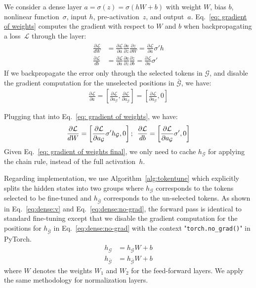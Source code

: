 We consider a dense layer $a = \sigma (z) = \sigma (hW + b)$ with weight $W$, bias $b$, nonlinear function~$\sigma$, input $h$, pre-activation~$z$, and output~$a$.
Eq.~\ref{eq: gradient of weights} computes the gradient with respect to $W$ and $b$ when backpropagating a loss~$\mathcal{L}$ through the layer:
\begin{align}\label{eq: gradient of weights}
\begin{split}
 \frac{\partial \mathcal{L}}{dW} &= \frac{\partial \mathcal{L}}{\partial a}\frac{\partial a}{\partial z}\frac{\partial z}{\partial W} =
    \frac{\partial \mathcal{L}}{\partial a} \sigma' h \\
\frac{\partial \mathcal{L}}{db} &= \frac{\partial \mathcal{L}}{\partial a}\frac{\partial a}{\partial z}\frac{\partial z}{\partial b} = \frac{\partial \mathcal{L}}{\partial a} \sigma'
\end{split}
\end{align}If we backpropagate the error only through the selected tokens in $\mathcal{G}$, and disable the gradient computation for the unselected positions in $\bar{\mathcal{G}}$, we have:
\begin{align}
    \frac{\partial \mathcal{L}}{\partial a} = \left[ \frac{\partial \mathcal{L}}{\partial a_{\mathcal{G}}}, \frac{\partial \mathcal{L}}{\partial a_{\bar{\mathcal{G}}}} \right] = \left[ \frac{\partial \mathcal{L}}{\partial a_{\mathcal{G}}}, 0 \right]
\end{align}

Plugging that into Eq.~\ref{eq: gradient of weights}, we have:
\begin{align} \label{eq: gradient of weights final}
    \frac{\partial \mathcal{L}}{dW} = \left[ \frac{\partial \mathcal{L}}{\partial a_{\mathcal{G}}} \sigma' h_{\mathcal{G}}, 0 \right];
    \hspace{0.5em} \frac{\partial \mathcal{L}}{db} = \left[ \frac{\partial \mathcal{L}}{\partial a_{\mathcal{G}}} \sigma', 0 \right]
\end{align}
Given Eq.~\ref{eq: gradient of weights final}, we only need to cache $h_{\mathcal{G}}$ for applying the chain rule, instead of the full activation~$h$. 

Regarding implementation, we use Algorithm~\ref{alg:tokentune} which explicitly splits the hidden states into two groups where $h_{\mathcal{G}}$ corresponds to the tokens selected to be fine-tuned and $h_{\bar{\mathcal{G}}}$ corresponds to the un-selected tokens. As shown in Eq.~\ref{eq:dense:v} and Eq.~\ref{eq:dense:no-grad}, the forward pass is identical to standard fine-tuning except that we disable the gradient computation for the positions for $h_{\bar{\mathcal{G}}}$ in Eq.~\ref{eq:dense:no-grad} with the context "\texttt{torch.no\_grad()}" in PyTorch. 
\begin{align}
h_{\mathcal{G}} &= h_{\mathcal{G}}W + b \label{eq:dense:v}\\
h_{\bar{\mathcal{G}}} &= h_{\bar{\mathcal{G}}}W + b\label{eq:dense:no-grad}
\end{align}
where $W$ denotes the weights $W_1$ and $W_2$ for the feed-forward layers. We apply the same methodology for normalization layers.


